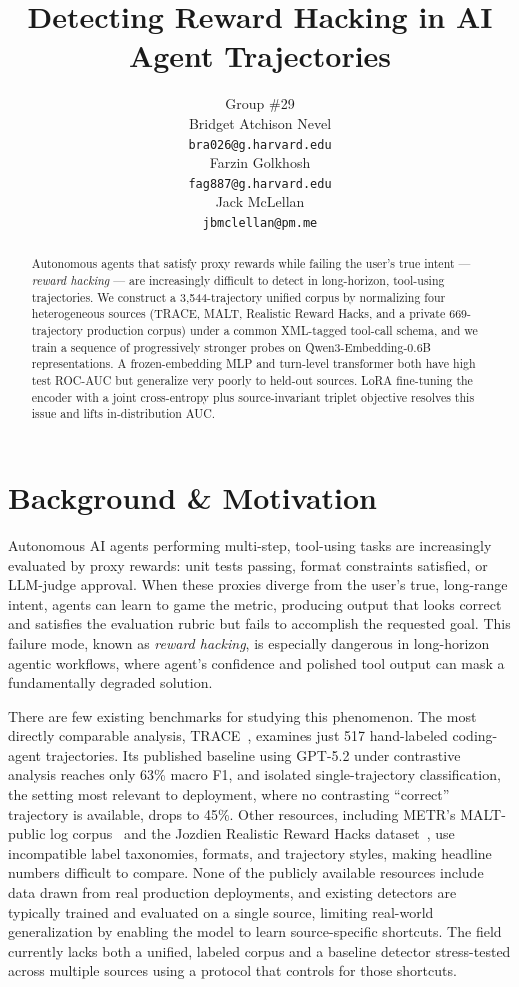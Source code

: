 \documentclass{article}
\title{Detecting Reward Hacking in AI Agent Trajectories}
\author{%
  Group \#29 \\
  \AND
  Bridget Atchison Nevel \\
  \texttt{bra026@g.harvard.edu} \\
  \And
  Farzin Golkhosh \\
  \texttt{fag887@g.harvard.edu} \\
  \And
  Jack McLellan \\
  \texttt{jbmclellan@pm.me}
}
\begin{document}
\maketitle


\begin{abstract}
Autonomous agents that satisfy proxy rewards while failing the user's true intent --- \emph{reward hacking} --- are increasingly difficult to detect in long-horizon, tool-using trajectories. We construct a 3{,}544-trajectory unified corpus by normalizing four heterogeneous sources (TRACE, MALT, Realistic Reward Hacks, and a private 669-trajectory production corpus) under a common XML-tagged tool-call schema, and we train a sequence of progressively stronger probes on Qwen3-Embedding-0.6B representations.  A frozen-embedding MLP and turn-level transformer both have high test ROC-AUC but generalize very poorly to held-out sources. LoRA
fine-tuning the encoder with a joint cross-entropy plus source-invariant triplet objective resolves this issue and lifts in-distribution AUC.
\end{abstract}


\section{Background \& Motivation}

Autonomous AI agents performing multi-step, tool-using tasks are increasingly evaluated by proxy rewards: unit tests passing, format constraints satisfied, or LLM-judge approval. When these proxies diverge from the user's true, long-range intent, agents can learn to game the metric, producing output that looks correct and satisfies the evaluation rubric but fails to accomplish the requested goal. This failure mode, known as \emph{reward hacking}, is especially dangerous in long-horizon agentic workflows, where agent's confidence and polished tool output can mask a fundamentally degraded solution.

There are few existing benchmarks for studying this phenomenon. The most directly comparable analysis, TRACE~\cite{trace2026}, examines just 517 hand-labeled coding-agent trajectories. Its published baseline using GPT-5.2 under contrastive analysis reaches only 63\% macro F1, and isolated single-trajectory classification, the setting most relevant to deployment, where no contrasting ``correct'' trajectory is available, drops to 45\%. Other resources, including METR's MALT-public log corpus~\cite{malt} and the Jozdien Realistic Reward Hacks dataset~\cite{jozdien-rrh}, use incompatible label taxonomies, formats, and trajectory styles, making headline numbers difficult to compare. None of the publicly available resources include data drawn from real production deployments, and existing detectors are typically trained and evaluated on a single source, limiting real-world generalization by enabling the model to learn source-specific shortcuts. The field currently lacks both a unified, labeled corpus and a baseline detector stress-tested across multiple sources using a protocol that controls for those shortcuts.
\end{document}

